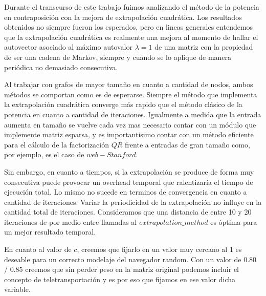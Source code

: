 Durante el transcurso de este trabajo fuimos analizando el m\'etodo de la potencia en contraposici\'on con la mejora de extrapolaci\'on cuadr\'atica. Los resultados obtenidos no siempre fueron los esperados, pero en lineas generales entendemos que la extrapolaci\'on cuadr\'atica es realmente una mejora al momento de hallar el autovector asociado al m\'aximo autovalor $\lambda = 1$ de una matriz con la propiedad de ser una cadena de Markov, siempre y cuando se lo aplique de manera peri\'odica no demasiado consecutiva.

Al trabajar con grafos de mayor tama\~no en cuanto a cantidad de nodos, ambos m\'etodos se comportan como es de esperarse. Siempre el m\'etodo que implementa la extrapolaci\'on cuadr\'atica converge m\'as rapido que el m\'etodo cl\'asico de la potencia en cuanto a cantidad de iteraciones. Igualmente a medida que la entrada aumenta en tama\~no se vuelve cada vez mas necesario contar con un m\'odulo que implemente matriz esparsa, y es importantisimo contar con un m\'etodo eficiente para el c\'alculo de la factorizaci\'on $QR$ frente a entradas de gran tama\~no como, por ejemplo, es el caso de $web-Stanford$.

Sin embargo, en cuanto a tiempos, si la extrapolaci\'on se produce de forma muy consecutiva puede provocar un overhead temporal que ralentizar\'ia el tiempo de ejecuci\'on total. Lo mismo no sucede en terminos de convergencia en cuanto a cantidad de iteraciones. Variar la periodicidad de la extrapolaci\'on no influye en la cantidad total de iteraciones. Consideramos que una distancia de entre 10 y 20 iteraciones de por medio entre llamadas al $extrapolation\_method$ es \'optima para un mejor resultado temporal.

En cuanto al valor de $c$, creemos que fijarlo en un valor muy cercano al 1 es deseable para un correcto modelaje del navegador random. Con un valor de 0.80 / 0.85 creemos que sin perder peso en la matriz original podemos incluir el concepto de teletransportaci\'on y es por eso que fijamos en ese valor dicha variable.

